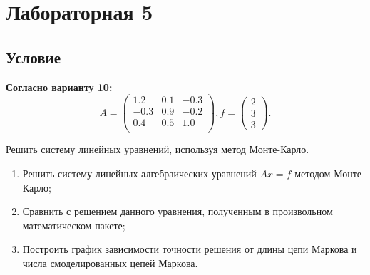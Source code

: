 \section{Лабораторная 5}

\subsection{Условие}

\textbf{Согласно варианту 10:}
\begin{equation}
	A = \begin{pmatrix}
			1.2 & 0.1 & -0.3 \\
			-0.3 & 0.9 & -0.2 \\
			0.4 & 0.5 & 1.0 \\
		\end{pmatrix},
	f = \begin{pmatrix}
			2 \\
			3 \\
			3
		\end{pmatrix}.
\end{equation}

Решить систему линейных уравнений, используя метод Монте-Карло.

\begin{enumerate}
	\item Решить систему линейных алгебраических уравнений $Ax = f$ методом Монте-Карло;
	\item Сравнить с решением данного уравнения, полученным в произвольном математическом пакете;
	\item Построить график зависимости точности решения от длины цепи Маркова и числа смоделированных цепей Маркова.
\end{enumerate}
